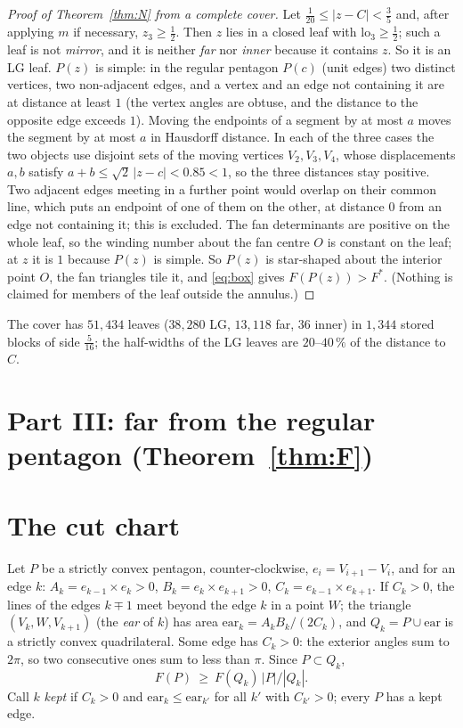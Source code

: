 \documentclass[11pt]{article}
\theoremstyle{remark}
\begin{document}
\begin{proof}[Proof of Theorem~\ref{thm:N} from a complete cover]
Let $\frac1{20}\le|z-C|<\frac35$ and, after applying $m$ if necessary, $z_3\ge\frac12$. Then $z$ lies in a closed leaf
with $\mathrm{lo}_3\ge\frac12$; such a leaf is not \emph{mirror}, and it is neither \emph{far} nor \emph{inner} because
it contains $z$. So it is an LG leaf. $P(z)$ is simple: in the regular pentagon $P(c)$ (unit edges) two distinct
vertices, two non-adjacent edges, and a vertex and an edge not containing it are at distance at least $1$ (the vertex
angles are obtuse, and the distance to the opposite edge exceeds $1$). Moving the endpoints of a segment by at most $a$
moves the segment by at most $a$ in Hausdorff distance. In each of the three cases the two objects use disjoint sets of
the moving vertices $V_2,V_3,V_4$, whose displacements $a,b$ satisfy $a+b\le\sqrt2\,|z-c|<0.85<1$, so the three
distances stay positive. Two adjacent edges meeting in a further point would overlap on their common line, which puts
an endpoint of one of them on the other, at distance $0$ from an edge not containing it; this is excluded. The fan
determinants are positive on the whole leaf, so the winding number about the fan centre $O$ is constant on the leaf; at
$z$ it is $1$ because $P(z)$ is simple. So $P(z)$ is star-shaped about the interior point $O$, the fan triangles tile it,
and \eqref{eq:box} gives $F(P(z))>F^*$. (Nothing is claimed for members of the leaf outside the annulus.)
\end{proof}
The cover has $51{,}434$ leaves ($38{,}280$ LG, $13{,}118$ far, $36$ inner) in $1{,}344$ stored blocks of side
$\frac5{16}$; the half-widths of the LG leaves are $20$--$40\,\%$ of the distance to $C$.

\section*{Part III: far from the regular pentagon (Theorem~\ref{thm:F})}
\section{The cut chart}\label{sec:cut}
Let $P$ be a strictly convex pentagon, counter-clockwise, $e_i=V_{i+1}-V_i$, and for an edge $k$:
$A_k=e_{k-1}\times e_k>0$, $B_k=e_k\times e_{k+1}>0$, $C_k=e_{k-1}\times e_{k+1}$. If $C_k>0$, the lines of the edges $k\mp1$
meet beyond the edge $k$ in a point $W$; the triangle $(V_k,W,V_{k+1})$ (the \emph{ear} of $k$) has area
$\mathrm{ear}_k=A_kB_k/(2C_k)$, and $Q_k=P\cup\mathrm{ear}$ is a strictly convex quadrilateral. Some edge has $C_k>0$: the
exterior angles sum to $2\pi$, so two consecutive ones sum to less than $\pi$. Since $P\subset Q_k$,
\begin{equation}\label{eq:F1}
F(P)\ \ge\ F(Q_k)\,|P|/|Q_k| .
\end{equation}
Call $k$ \emph{kept} if $C_k>0$ and $\mathrm{ear}_k\le\mathrm{ear}_{k'}$ for all $k'$ with $C_{k'}>0$; every $P$ has a kept
edge.
\end{document}
